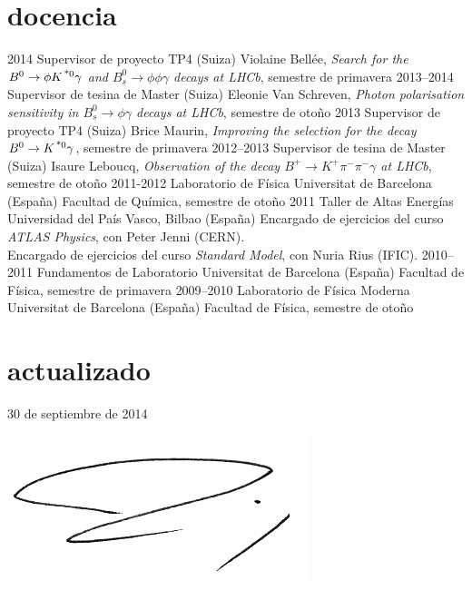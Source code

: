 {
\section{docencia}
    \cventry
        {2014}
        {Supervisor de proyecto TP4}
        {\epfl(Suiza)}
        {Violaine Bellée, \emph{Search for the $B^0\rightarrow \phi K^{\text{\,*}0}\gamma$ and $B_s^0\rightarrow \phi \phi\gamma$ decays at LHCb}, semestre de primavera}
    \cventry
        {2013--2014}
        {Supervisor de tesina de Master}
        {\epfl(Suiza)}
        {Eleonie Van Schreven, \emph{Photon polarisation sensitivity in $B^0_s\rightarrow \phi\gamma$ decays at LHCb}, semestre de otoño}
    \cventry
        {2013}
        {Supervisor de proyecto TP4}
        {\epfl(Suiza)}
        {Brice Maurin, \emph{Improving the selection for the decay $B^0\rightarrow K^{\text{\,*}0} \gamma$}, semestre de primavera}
    \cventry
        {2012--2013}
        {Supervisor de tesina de Master}
        {\epfl(Suiza)}
        {Isaure Leboucq, \emph{Observation of the decay $B^+\rightarrow K^+\pi^-\pi^-\gamma$ at LHCb}, semestre de otoño}
    \cventry
        {2011-2012}
        {Laboratorio de Física}
        {Universitat de Barcelona (España)}
        {Facultad de Química, semestre de otoño}
    \cventry
        {2011}
        {Taller de Altas Energ\'{i}as}
        {Universidad del País Vasco, Bilbao (España)}
        {Encargado de ejercicios del curso \emph{ATLAS Physics}, con Peter Jenni (CERN).\\
         Encargado de ejercicios del curso \emph{Standard Model}, con Nuria Rius (IFIC).}
    \cventry
        {2010--2011}
        {Fundamentos de Laboratorio}
        {Universitat de Barcelona (España)}
        {Facultad de Física, semestre de primavera}
    \cventry
        {2009--2010}
        {Laboratorio de Física Moderna}
        {Universitat de Barcelona (España)}
        {Facultad de Física, semestre de otoño}
}{}
    
\section{actualizado}
30 de septiembre de 2014

\includegraphics{signature.jpg}

